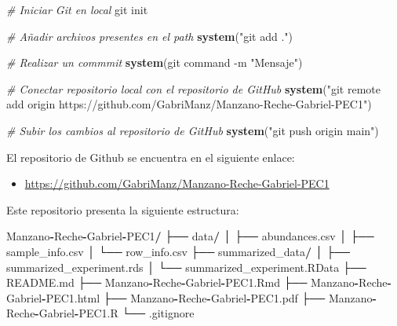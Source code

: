 \documentclass[
]{article}
\newenvironment{Shaded}{\begin{snugshade}}{\end{snugshade}}
\newcommand{\CommentTok}[1]{\textcolor[rgb]{0.56,0.35,0.01}{\textit{#1}}}
\newcommand{\FunctionTok}[1]{\textcolor[rgb]{0.13,0.29,0.53}{\textbf{#1}}}
\newcommand{\NormalTok}[1]{#1}
\newcommand{\SpecialCharTok}[1]{\textcolor[rgb]{0.81,0.36,0.00}{\textbf{#1}}}
\newcommand{\StringTok}[1]{\textcolor[rgb]{0.31,0.60,0.02}{#1}}
\providecommand{\tightlist}{%
  \setlength{\itemsep}{0pt}\setlength{\parskip}{0pt}}
\begin{document}
\begin{Shaded}
\begin{Highlighting}[]
\CommentTok{\# Iniciar Git en local}
\NormalTok{git init}

\CommentTok{\# Añadir archivos presentes en el path}
\FunctionTok{system}\NormalTok{(}\StringTok{"git add ."}\NormalTok{)}

\CommentTok{\# Realizar un commmit}
\FunctionTok{system}\NormalTok{(}\StringTok{\textquotesingle{}git command {-}m "Mensaje"\textquotesingle{}}\NormalTok{)}

\CommentTok{\# Conectar repositorio local con el repositorio de GitHub}
\FunctionTok{system}\NormalTok{(}\StringTok{"git remote add origin https://github.com/GabriManz/Manzano{-}Reche{-}Gabriel{-}PEC1"}\NormalTok{)}

\CommentTok{\# Subir los cambios al repositorio de GitHub}
\FunctionTok{system}\NormalTok{(}\StringTok{"git push origin main"}\NormalTok{)}
\end{Highlighting}
\end{Shaded}

El repositorio de Github se encuentra en el siguiente enlace:

\begin{itemize}
\tightlist
\item
  \url{https://github.com/GabriManz/Manzano-Reche-Gabriel-PEC1}
\end{itemize}

Este repositorio presenta la siguiente estructura:

\begin{Shaded}
\begin{Highlighting}[]
\NormalTok{Manzano}\SpecialCharTok{{-}}\NormalTok{Reche}\SpecialCharTok{{-}}\NormalTok{Gabriel}\SpecialCharTok{{-}}\NormalTok{PEC1}\SpecialCharTok{/}
\NormalTok{├── data}\SpecialCharTok{/}                       
\NormalTok{│   ├── abundances.csv          }
\NormalTok{│   ├── sample\_info.csv         }
\NormalTok{│   └── row\_info.csv            }
\NormalTok{├── summarized\_data}\SpecialCharTok{/}            
\NormalTok{│   ├── summarized\_experiment.rds   }
\NormalTok{│   └── summarized\_experiment.RData }
\NormalTok{├── README.md                   }
\NormalTok{├── Manzano}\SpecialCharTok{{-}}\NormalTok{Reche}\SpecialCharTok{{-}}\NormalTok{Gabriel}\SpecialCharTok{{-}}\NormalTok{PEC1.Rmd }
\NormalTok{├── Manzano}\SpecialCharTok{{-}}\NormalTok{Reche}\SpecialCharTok{{-}}\NormalTok{Gabriel}\SpecialCharTok{{-}}\NormalTok{PEC1.html}
\NormalTok{├── Manzano}\SpecialCharTok{{-}}\NormalTok{Reche}\SpecialCharTok{{-}}\NormalTok{Gabriel}\SpecialCharTok{{-}}\NormalTok{PEC1.pdf}
\NormalTok{├── Manzano}\SpecialCharTok{{-}}\NormalTok{Reche}\SpecialCharTok{{-}}\NormalTok{Gabriel}\SpecialCharTok{{-}}\NormalTok{PEC1.R}
\NormalTok{└── .gitignore                  }
\end{Highlighting}
\end{Shaded}
\end{document}
